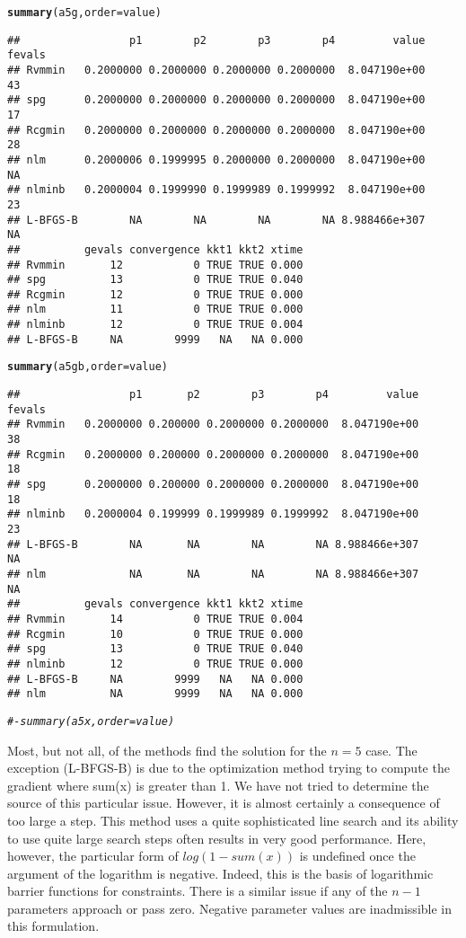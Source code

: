 \documentclass[11pt]{article}\usepackage[]{graphicx}\usepackage[]{color}
\makeatletter
\newcommand{\hlcom}[1]{\textcolor[rgb]{0.678,0.584,0.686}{\textit{#1}}}%
\newcommand{\hlstd}[1]{\textcolor[rgb]{0.345,0.345,0.345}{#1}}%
\newcommand{\hlkwc}[1]{\textcolor[rgb]{0.333,0.667,0.333}{#1}}%
\newcommand{\hlkwd}[1]{\textcolor[rgb]{0.737,0.353,0.396}{\textbf{#1}}}%
\newenvironment{kframe}{%
 \def\at@end@of@kframe{}%
 \ifinner\ifhmode%
  \def\at@end@of@kframe{\end{minipage}}%
  \begin{minipage}{\columnwidth}%
 \fi\fi%
 \def\FrameCommand##1{\hskip\@totalleftmargin \hskip-\fboxsep
 \colorbox{shadecolor}{##1}\hskip-\fboxsep
     \hskip-\linewidth \hskip-\@totalleftmargin \hskip\columnwidth}%
 \MakeFramed {\advance\hsize-\width
   \@totalleftmargin\z@ \linewidth\hsize
   \@setminipage}}%
 {\par\unskip\endMakeFramed%
 \at@end@of@kframe}
\newenvironment{knitrout}{}{} %
\makeatother
\begin{document}
\begin{knitrout}
\begin{kframe}
\begin{alltt}
\hlkwd{summary}\hlstd{(a5g,}\hlkwc{order}\hlstd{=value)}
\end{alltt}
\begin{verbatim}
##                 p1        p2        p3        p4         value fevals
## Rvmmin   0.2000000 0.2000000 0.2000000 0.2000000  8.047190e+00     43
## spg      0.2000000 0.2000000 0.2000000 0.2000000  8.047190e+00     17
## Rcgmin   0.2000000 0.2000000 0.2000000 0.2000000  8.047190e+00     28
## nlm      0.2000006 0.1999995 0.2000000 0.2000000  8.047190e+00     NA
## nlminb   0.2000004 0.1999990 0.1999989 0.1999992  8.047190e+00     23
## L-BFGS-B        NA        NA        NA        NA 8.988466e+307     NA
##          gevals convergence kkt1 kkt2 xtime
## Rvmmin       12           0 TRUE TRUE 0.000
## spg          13           0 TRUE TRUE 0.040
## Rcgmin       12           0 TRUE TRUE 0.000
## nlm          11           0 TRUE TRUE 0.000
## nlminb       12           0 TRUE TRUE 0.004
## L-BFGS-B     NA        9999   NA   NA 0.000
\end{verbatim}
\begin{alltt}
\hlkwd{summary}\hlstd{(a5gb,}\hlkwc{order}\hlstd{=value)}
\end{alltt}
\begin{verbatim}
##                 p1       p2        p3        p4         value fevals
## Rvmmin   0.2000000 0.200000 0.2000000 0.2000000  8.047190e+00     38
## Rcgmin   0.2000000 0.200000 0.2000000 0.2000000  8.047190e+00     18
## spg      0.2000000 0.200000 0.2000000 0.2000000  8.047190e+00     18
## nlminb   0.2000004 0.199999 0.1999989 0.1999992  8.047190e+00     23
## L-BFGS-B        NA       NA        NA        NA 8.988466e+307     NA
## nlm             NA       NA        NA        NA 8.988466e+307     NA
##          gevals convergence kkt1 kkt2 xtime
## Rvmmin       14           0 TRUE TRUE 0.004
## Rcgmin       10           0 TRUE TRUE 0.000
## spg          13           0 TRUE TRUE 0.040
## nlminb       12           0 TRUE TRUE 0.000
## L-BFGS-B     NA        9999   NA   NA 0.000
## nlm          NA        9999   NA   NA 0.000
\end{verbatim}
\begin{alltt}
\hlcom{#- summary(a5x,order=value)}
\end{alltt}
\end{kframe}
\end{knitrout}

Most, but not all, of the methods find the solution for the $n=5$ case. 
The exception (L-BFGS-B) is due to the optimization method trying to 
compute the gradient where sum(x) is greater than 1. We 
have not tried to determine the source of this particular issue. However, 
it is almost certainly 
a consequence of too large a step. This method uses a quite sophisticated
line search and its ability to use quite large search steps often results in
very good performance. Here, however, the particular form of $log(1-sum(x))$ 
is undefined once the argument of
the logarithm is negative. Indeed, this is the basis of 
logarithmic barrier functions for constraints. There
is a similar issue if any of the $n-1$ parameters approach or pass zero. Negative 
parameter values are inadmissible in this formulation. 
\end{document}
